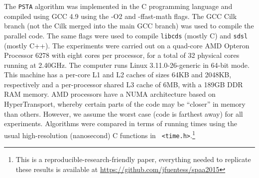 The {\tt PSTA} algorithm was implemented in the C programming language
and compiled using GCC 4.9 using the -O2 and -ffast-math flags. The
GCC Cilk branch (not the Cilk merged into the main GCC branch) was
used to compile the parallel code. The same flags were used to compile
{\tt libcds} (mostly C) and {\tt sdsl} (mostly C++). The experiments
were carried out on a quad-core AMD Opteron\texttrademark{} Processor
6278 with eight cores per processor, for a total of 32 physical cores
running at 2.40GHz. The computer runs Linux 3.11.0-26-generic in
64-bit mode. This machine has a per-core L1 and L2 caches of sizes
64KB and 2048KB, respectively and a per-processor shared L3 cache of
6MB, with a 189GB DDR RAM memory. AMD processors have a NUMA
architecture based on HyperTransport, whereby certain parts of the
code may be ``closer'' in memory than others. However, we assume the
worst case (code is farthest away) for all experiments. Algorithms
were compared in terms of running times using the usual
high-resolution (nanosecond) C functions in {\tt
<time.h>}.\footnote{This is a reproducible-research-friendly paper,
everything needed to replicate these results is available at
\url{https://github.com/jfuentess/spaa2015}}